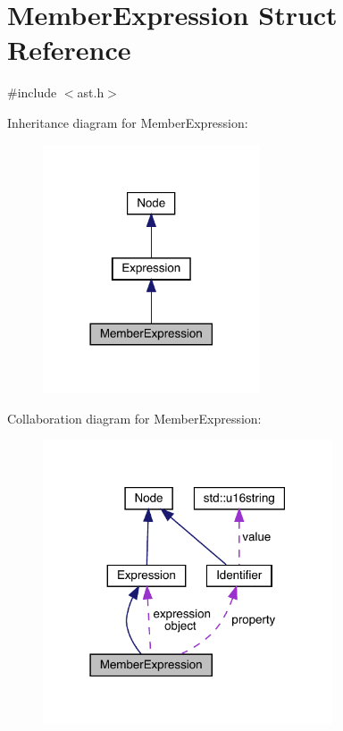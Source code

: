\hypertarget{struct_member_expression}{}\section{Member\+Expression Struct Reference}
\label{struct_member_expression}


{\ttfamily \#include $<$ast.\+h$>$}



Inheritance diagram for Member\+Expression\+:
\nopagebreak
\begin{figure}[H]
\begin{center}
\leavevmode
\includegraphics[width=182pt]{struct_member_expression__inherit__graph}
\end{center}
\end{figure}


Collaboration diagram for Member\+Expression\+:
\nopagebreak
\begin{figure}[H]
\begin{center}
\leavevmode
\includegraphics[width=243pt]{struct_member_expression__coll__graph}
\end{center}
\end{figure}
